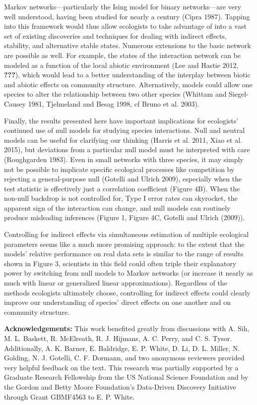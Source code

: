 \documentclass[12pt,]{article}
\begin{document}
\begin{spacing}{1.9}
\begin{flushleft}
Markov networks---particularly the Ising model for binary networks---are
very well understood, having been studied for nearly a century (Cipra
1987). Tapping into this framework would thus allow ecologists to take
advantage of into a vast set of existing discoveries and techniques for
dealing with indirect effects, stability, and alternative stable states.
Numerous extensions to the basic network are possible as well. For
example, the states of the interaction network can be modeled as a
function of the local abiotic environment (Lee and Hastie 2012,
{\textbf{???}}), which would lead to a better understanding of the
interplay between biotic and abiotic effects on community structure.
Alternatively, models could allow one species to alter the relationship
between two other species (Whittam and Siegel-Causey 1981, Tjelmeland
and Besag 1998, cf Bruno et al. 2003).

Finally, the results presented here have important implications for
ecologists' continued use of null models for studying species
interactions. Null and neutral models can be useful for clarifying our
thinking (Harris et al. 2011, Xiao et al. 2015), but deviations from a
particular null model must be interpreted with care (Roughgarden 1983).
Even in small networks with three species, it may simply not be possible
to implicate specific ecological processes like competition by rejecting
a general-purpose null (Gotelli and Ulrich 2009), especially when the
test statistic is effectively just a correlation coefficient (Figure
4B). When the non-null backdrop is not controlled for, Type I error
rates can skyrocket, the apparent sign of the interaction can change,
and null models can routinely produce misleading inferences (Figure 1,
Figure 4C, Gotelli and Ulrich (2009)).

Controlling for indirect effects via simultaneous estimation of multiple
ecological parameters seems like a much more promising approach: to the
extent that the models' relative performance on real data sets is
similar to the range of results shown in Figure 3, scientists in this
field could often triple their explanatory power by switching from null
models to Markov networks (or increase it nearly as much with linear or
generalized linear approximations). Regardless of the methods ecologists
ultimately choose, controlling for indirect effects could clearly
improve our understanding of species' direct effects on one another and
on community structure.

\noindent \textbf{Acknowledgements:} This work benefited greatly from
discussions with A. Sih, M. L. Baskett, R. McElreath, R. J. Hijmans, A.
C. Perry, and C. S. Tysor. Additionally, A. K. Barner, E. Baldridge, E.
P. White, D. Li, D. L. Miller, N. Golding, N. J. Gotelli, C. F. Dormann,
and two anonymous reviewers provided very helpful feedback on the text.
This research was partially supported by a Graduate Research Fellowship
from the US National Science Foundation and by the Gordon and Betty
Moore Foundation's Data-Driven Discovery Initiative through Grant
GBMF4563 to E. P. White.


\end{flushleft}
\end{spacing}
\end{document}
